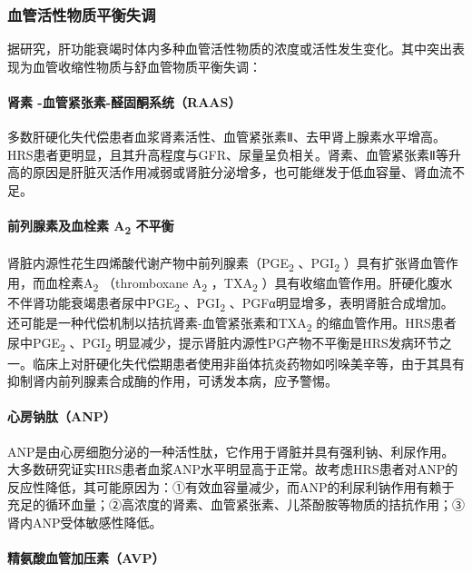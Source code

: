 \subsubsection{血管活性物质平衡失调}

据研究，肝功能衰竭时体内多种血管活性物质的浓度或活性发生变化。其中突出表现为血管收缩性物质与舒血管物质平衡失调：

\paragraph{肾素 -血管紧张素-醛固酮系统（RAAS）}

多数肝硬化失代偿患者血浆肾素活性、血管紧张素Ⅱ、去甲肾上腺素水平增高。HRS患者更明显，且其升高程度与GFR、尿量呈负相关。肾素、血管紧张素Ⅱ等升高的原因是肝脏灭活作用减弱或肾脏分泌增多，也可能继发于低血容量、肾血流不足。

\paragraph{前列腺素及血栓素 A\textsubscript{2} 不平衡}

肾脏内源性花生四烯酸代谢产物中前列腺素（PGE\textsubscript{2}
、PGI\textsubscript{2} ）具有扩张肾血管作用，而血栓素A\textsubscript{2}
（thromboxane A\textsubscript{2} ，TXA\textsubscript{2}
）具有收缩血管作用。肝硬化腹水不伴肾功能衰竭患者尿中PGE\textsubscript{2}
、PGI\textsubscript{2}
、PGFα明显增多，表明肾脏合成增加。还可能是一种代偿机制以拮抗肾素-血管紧张素和TXA\textsubscript{2}
的缩血管作用。HRS患者尿中PGE\textsubscript{2} 、PGI\textsubscript{2}
明显减少，提示肾脏内源性PG产物不平衡是HRS发病环节之一。临床上对肝硬化失代偿期患者使用非甾体抗炎药物如吲哚美辛等，由于其具有抑制肾内前列腺素合成酶的作用，可诱发本病，应予警惕。

\paragraph{心房钠肽（ANP）}

ANP是由心房细胞分泌的一种活性肽，它作用于肾脏并具有强利钠、利尿作用。大多数研究证实HRS患者血浆ANP水平明显高于正常。故考虑HRS患者对ANP的反应性降低，其可能原因为：①有效血容量减少，而ANP的利尿利钠作用有赖于充足的循环血量；②高浓度的肾素、血管紧张素、儿茶酚胺等物质的拮抗作用；③肾内ANP受体敏感性降低。

\paragraph{精氨酸血管加压素（AVP）}

